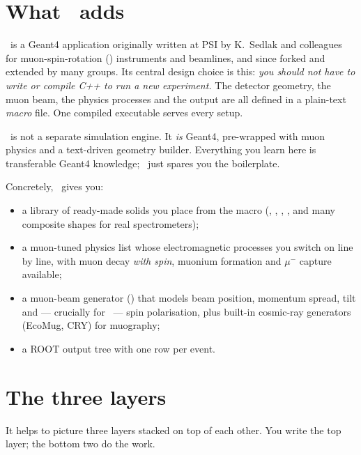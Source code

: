 \section{What \musrSim\ adds}
\musrSim\ is a Geant4 application originally written at PSI by K.~Sedlak and colleagues for muon-spin-rotation (\muSR) instruments and beamlines, and since forked and extended by many groups. Its central design choice is this: \emph{you should not have to write or compile C++ to run a new experiment.} The detector geometry, the muon beam, the physics processes and the output are all defined in a plain-text \emph{macro} file. One compiled executable serves every setup.

\begin{keypoint}
\musrSim\ is not a separate simulation engine. It \emph{is} Geant4, pre-wrapped with muon physics and a text-driven geometry builder. Everything you learn here is transferable Geant4 knowledge; \musrSim\ just spares you the boilerplate.
\end{keypoint}

Concretely, \musrSim\ gives you:
\begin{itemize}
  \item a library of ready-made solids you place from the macro (, , , , and many composite shapes for real spectrometers);
  \item a muon-tuned physics list whose electromagnetic processes you switch on line by line, with muon decay \emph{with spin}, muonium formation and \(\mu^-\) capture available;
  \item a muon-beam generator () that models beam position, momentum spread, tilt and --- crucially for \muSR\ --- spin polarisation, plus built-in cosmic-ray generators (EcoMug, CRY) for muography;
  \item a ROOT output tree with one row per event.
\end{itemize}

\section{The three layers}
It helps to picture three layers stacked on top of each other. You write the top layer; the bottom two do the work.

